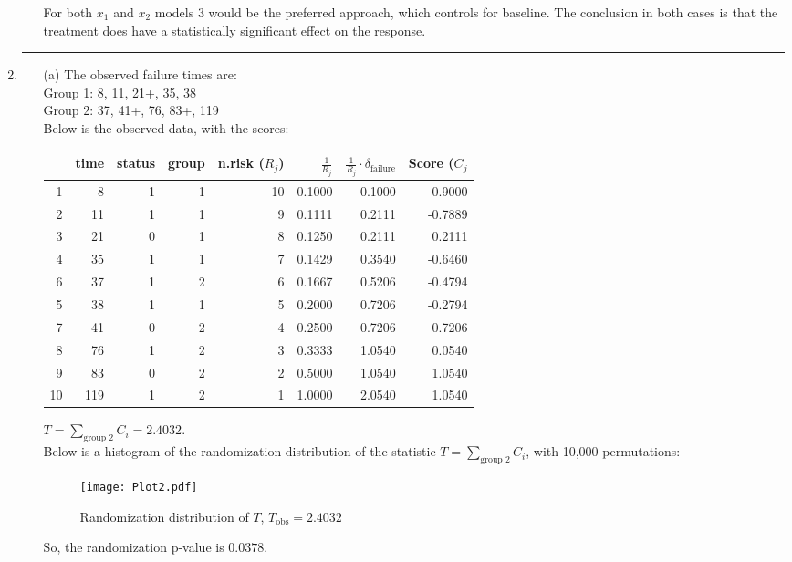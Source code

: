 \documentclass[11pt,a4paper]{article}
\begin{document}
\begin{enumerate}
\begin{enumerate}
For both $x_1$ and $x_2$ models 3 would be the preferred approach, which controls for baseline. The conclusion in both cases is that the treatment does have a statistically significant effect on the response. 
\end{enumerate}

\rule{\textwidth}{1pt}
\vspace{1in}
\item
\begin{enumerate}
\item[(a)] The observed failure times are:\\
Group 1: 8, 11, 21+, 35, 38 \\
Group 2: 37, 41+, 76, 83+, 119\\
Below is the observed data, with the scores:
\begin{table}[ht]
\centering
\begin{tabular}{rrrrrrrr}
  \hline
 & time & status & group & n.risk ($R_j$)& $\frac{1}{R_j}$ & $\frac{1}{R_j}\cdot \delta_{\text{failure}}$ & Score ($C_j$ \\ 
  \hline
  1 & 8 & 1 & 1 & 10 & 0.1000 & 0.1000 & -0.9000 \\ 
  2 & 11 & 1 & 1 & 9 & 0.1111 & 0.2111 & -0.7889 \\ 
  3 & 21 & 0 & 1 & 8 & 0.1250 & 0.2111 & 0.2111 \\ 
  4 & 35 & 1 & 1 & 7 & 0.1429 & 0.3540 & -0.6460 \\ 
  6 & 37 & 1 & 2 & 6 & 0.1667 & 0.5206 & -0.4794 \\ 
  5 & 38 & 1 & 1 & 5 & 0.2000 & 0.7206 & -0.2794 \\ 
  7 & 41 & 0 & 2 & 4 & 0.2500 & 0.7206 & 0.7206 \\ 
  8 & 76 & 1 & 2 & 3 & 0.3333 & 1.0540 & 0.0540 \\ 
  9 & 83 & 0 & 2 & 2 & 0.5000 & 1.0540 & 1.0540 \\ 
 10 & 119 & 1 & 2 & 1 & 1.0000 & 2.0540 & 1.0540 \\ 
   \hline
\end{tabular}
\end{table}
$T = \sum_{\text{group } 2} C_i = 2.4032$.\\

Below is a histogram of the randomization distribution of the statistic $T = \sum_{\text{group } 2} C_i$, with 10,000 permutations:
\begin{figure}[H]
\begin{center}
\texttt{[image: Plot2.pdf]}
\end{center}
\caption{Randomization distribution of $T$, $T_{\text{obs}} = 2.4032$}
\label{fig:Fig2a}
\end{figure}
So, the randomization p-value is $0.0378$.\\


\end{enumerate}
\end{enumerate}
\end{document}
